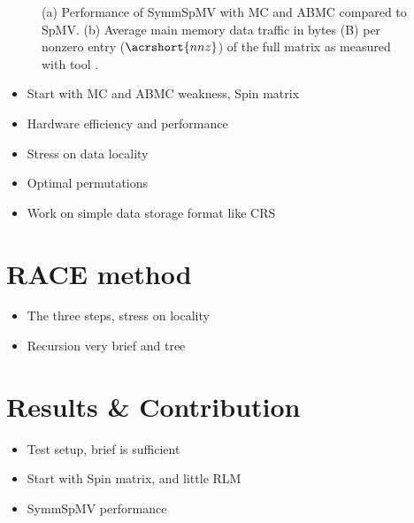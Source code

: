 \begin{figure}[b]
	\hspace{1em}
	\caption{\label{fig:motivation}(a) Performance of \acrshort{SymmSpMV} with 
		\acrshort{MC} and \acrshort{ABMC} compared to \acrshort{SpMV}. 
		(b) Average main memory data traffic in bytes (B) per nonzero entry ($\acrshort{nnz}$) 
		of the full matrix as measured with \LIKWID tool \cite{LIKWID}.}
\end{figure}


\begin{itemize}
	\item Start with MC and ABMC weakness, Spin matrix
	\item Hardware efficiency and performance
	\item Stress on data locality
	\item Optimal permutations
	\item Work on simple data storage format like \acrshort{CRS}
\end{itemize}


\section{RACE method} \label{sec:RACE_method}
\begin{itemize}
	\item The three steps, stress on locality
	\item Recursion very brief and tree
\end{itemize}


\section{Results \& Contribution} \label{sec:results}
\begin{itemize}
	\item Test setup, brief is sufficient
	\item Start with Spin matrix, and little RLM
	\item SymmSpMV performance
\end{itemize}
